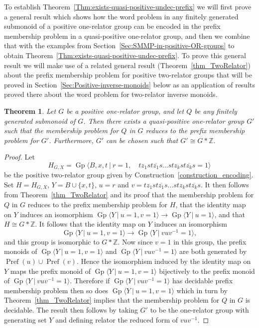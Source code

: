 \documentclass{amsart}
\newcommand{\Gpres}[2]{\operatorname{Gp}\bigl\langle #1\:|\:#2 \bigr\rangle}
\newcommand{\pref}[1]{\operatorname{Pref}( #1 )}
\theoremstyle{plain}
\newtheorem{theorem}{Theorem}[section]
\theoremstyle{definition}
\begin{document}
To establish Theorem~\ref{Thm:exists-quasi-positive-undec-prefix} we will first prove a general result which shows how the word problem in any finitely generated submonoid of a positive one-relator group can be encoded in the prefix membership problem in a quasi-positive one-relator group, and then we combine that with the examples from Section~\ref{Sec:SMMP-in-positive-OR-groups} to obtain Theorem~\ref{Thm:exists-quasi-positive-undec-prefix}. 
To prove this general result we will make use of a related general result (Theorem~\ref{thm_TwoRelator}) about the prefix membership problem for positive two-relator groups that will be proved in Section~\ref{Sec:Positive-inverse-monoids} below as an application of results proved there about the word problem for two-relator inverse monoids. 

\begin{theorem}\label{Thm:quasi-positive-prefix-reduces-to-membership-new-easy-proof}
Let $G$ be a positive one-relator group, and let $Q$ be any finitely generated submonoid of $G$. 
Then there exists a quasi-positive one-relator group $G'$ such that 
the membership problem for $Q$ in $G$ reduces to 
the prefix membership problem for $G'$.
Furthermore, $G'$ can be chosen such that $G' \cong G \ast \mathbb{Z}$. 
\end{theorem}\begin{proof}
Let 
\[
H_{G,X} = \Gpres{B,x,t}{
r = 1, \quad 
t z_1 s t\overline{z_1} s  \ldots  s t z_k s t\overline{z_k} s = 1
}
\]
be the positive two-relator group given by Construction~\ref{construction_encoding}.   
Set $H = H_{G,X}$, $Y = B \cup \{x,t\}$, $u=r$ and $v = t z_1 s t\overline{z_1} s  \ldots  s t z_k s t\overline{z_k} s$.  
It then follows from Theorem~\ref{thm_TwoRelator} and its proof that 
the membership problem for $Q$ in $G$ reduces to the prefix membership problem for $H$,  
that the identity map on $Y$ induces an isomorphism 
$\Gpres{Y}{u=1, v=1} \rightarrow \Gpres{Y}{u=1}$,
and that $H \cong G \ast \mathbb{Z}$.    
It follows that the identity map on $Y$ induces an isomorphism  
\[
\Gpres{Y}{u=1,v=1} \rightarrow \Gpres{Y}{vuv^{-1}=1}, 
\] 
and this group is isomorphic to $G \ast \mathbb{Z}$.
Now since $v=1$ in this group, the prefix monoids of   
$\Gpres{Y}{u=1,v=1}$ and $\Gpres{Y}{vuv^{-1}=1}$ are both generated by $\pref{u} \cup \pref{v}$. 
Hence the isomorphism induced by the identity map on $Y$ maps the prefix monoid of   
$\Gpres{Y}{u=1,v=1}$ bijectively to the prefix monoid of $\Gpres{Y}{vuv^{-1}=1}$. 
Therefore if $\Gpres{Y}{vuv^{-1}=1}$ has decidable prefix membership problem then so does 
$\Gpres{Y}{u=1,v=1}$ which in turn 
by Theorem~\ref{thm_TwoRelator} 
implies that the membership problem for $Q$ in $G$ is decidable. 
The result then follows by taking $G'$ to be the one-relator group with generating set $Y$ and defining relator the reduced form of $vuv^{-1}$.    
\end{proof}
\end{document}
